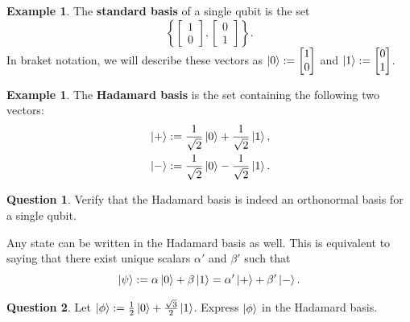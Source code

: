 \documentclass[letterpaper, 12pt]{article}
\newcommand{\1}{\mathds{1}}	%
\theoremstyle{definition}
\newtheorem{example}[theorem]{Example}
\newtheorem{question}{Question}
\begin{document}
\begin{example}
    The \textbf{standard basis} of a single qubit is the set 
    \begin{equation}
        \left\{ \begin{bmatrix}
            1 \\ 0
        \end{bmatrix}, \begin{bmatrix}
            0 \\ 1
        \end{bmatrix} \right\}.
    \end{equation}
    In braket notation, we will describe these vectors as $\ket{0} := \begin{bmatrix}
            1 \\ 0
        \end{bmatrix}$ and $\ket{1} := \begin{bmatrix}
            0 \\ 1
        \end{bmatrix}$. 
\end{example}


\begin{example}
    The \textbf{Hadamard basis} is the set containing the following two vectors:
    \begin{align}
        &\ket{+} := \frac{1}{\sqrt{2}} \ket{0} + \frac{1}{\sqrt{2}} \ket{1}, \\ 
        &\ket{-} := \frac{1}{\sqrt{2}} \ket{0} - \frac{1}{\sqrt{2}} \ket{1}.
    \end{align}
\end{example}

\begin{question}
    Verify that the Hadamard basis is indeed an orthonormal basis for a single qubit. 
\end{question}

\newpage 
Any state can be written in the Hadamard basis as well. This is equivalent to saying that there exist unique scalars $\alpha'$ and $\beta'$ such that
\begin{equation}
    \ket{\psi} := \alpha \ket{0} + \beta \ket{1} = \alpha' \ket{+} + \beta' \ket{-}.
\end{equation}

\begin{question}
    Let $\ket{\phi} := \frac{1}{2}\ket{0} + \frac{\sqrt{3}}{2} \ket{1}$. Express $\ket{\phi}$ in the Hadamard basis. 
\end{question}
\vspace{50mm}
\end{document}

